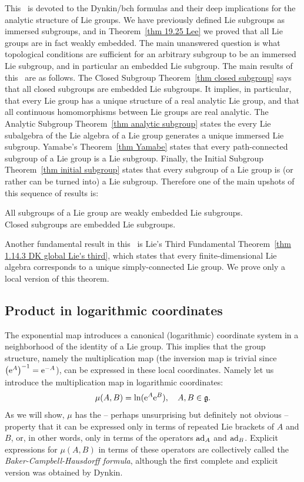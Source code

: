 This \sect\ is devoted to the Dynkin/\gls{bch} formulas and their deep implications for the analytic structure of Lie groups. We have previously defined Lie subgroups as immersed subgroups, and in Theorem~\ref{thm 19.25 Lee} we proved that all Lie groups are in fact weakly embedded. The main unanswered question is what topological conditions are sufficient for an arbitrary subgroup to be an immersed Lie subgroup, and in particular an embedded Lie subgroup. The main results of this \sect\ are as follows. The Closed Subgroup Theorem~\ref{thm closed subgroup} says that all closed subgroups are embedded Lie subgroups. It implies, in particular, that every Lie group has a unique structure of a real analytic Lie group, and that all continuous homomorphisms between Lie groups are real analytic. The Analytic Subgroup Theorem~\ref{thm analytic subgroup} states the every Lie subalgebra of the Lie algebra of a Lie group generates a unique immersed Lie subgroup. Yamabe's Theorem~\ref{thm Yamabe} states that every path-connected subgroup of a Lie group is a Lie subgroup.  Finally, the Initial Subgroup Theorem~\ref{thm initial subgroup} states that every subgroup of a Lie group is (or rather can be turned into) a Lie subgroup. Therefore one of the main upshots of this sequence of results is:
\begin{center}
    All subgroups of a Lie group are weakly embedded Lie subgroups.\\
    Closed subgroups are embedded Lie subgroups.
\end{center}
Another fundamental result in this \sect\ is Lie's Third Fundamental Theorem~\ref{thm 1.14.3 DK global Lie's third}, which states that every finite-dimensional Lie algebra corresponds to a unique simply-connected Lie group. We prove only a local version of this theorem.





\subsection{Product in logarithmic coordinates}\label{sec: product in log coordinates}

The exponential map introduces a canonical (logarithmic) coordinate system in a neighborhood of the identity of a Lie group. This implies that the group structure, namely the multiplication map (the inversion map is trivial since $\left(\mathrm{e}^A\right)^{-1}=\mathrm{e}^{-A}$), can be expressed in these local coordinates. Namely let us introduce the multiplication map in logarithmic coordinates:
\[\mu(A,B)=\ln(\mathrm{e}^A\mathrm{e}^B),\quad A,B\in\mathfrak{g}.\]
As we will show, $\mu$ has the -- perhaps unsurprising but definitely not obvious -- property that it can be expressed only in terms of repeated Lie brackets of $A$ and $B$, or, in other words, only in terms of the operators $\mathrm{ad}_A$ and $\mathrm{ad}_B$. Explicit expressions for $\mu(A,B)$ in terms of these operators are collectively called the \emph{Baker-Campbell-Hausdorff formula}, although the first complete and explicit version was obtained by Dynkin.

